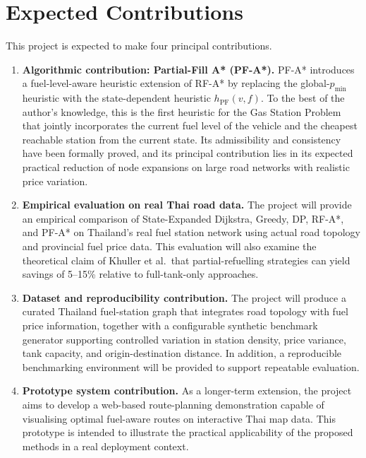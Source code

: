 \section{Expected Contributions}

This project is expected to make four principal contributions.

\begin{enumerate}
    \item \textbf{Algorithmic contribution: Partial-Fill A* (PF-A*).}
          PF-A* introduces a fuel-level-aware heuristic extension of RF-A* by replacing the global-$p_{\min}$ heuristic with the state-dependent heuristic $h_{\mathrm{PF}}(v,f)$.
          To the best of the author's knowledge, this is the first heuristic for the Gas Station Problem that jointly incorporates the current fuel level of the vehicle and the cheapest reachable station from the current state.
          Its admissibility and consistency have been formally proved, and its principal contribution lies in its expected practical reduction of node expansions on large road networks with realistic price variation.

    \item \textbf{Empirical evaluation on real Thai road data.}
          The project will provide an empirical comparison of State-Expanded Dijkstra, Greedy, DP, RF-A*, and PF-A* on Thailand's real fuel station network using actual road topology and provincial fuel price data.
          This evaluation will also examine the theoretical claim of Khuller et al.\ that partial-refuelling strategies can yield savings of 5--15\% relative to full-tank-only approaches.

    \item \textbf{Dataset and reproducibility contribution.}
          The project will produce a curated Thailand fuel-station graph that integrates road topology with fuel price information, together with a configurable synthetic benchmark generator supporting controlled variation in station density, price variance, tank capacity, and origin-destination distance.
          In addition, a reproducible benchmarking environment will be provided to support repeatable evaluation.

    \item \textbf{Prototype system contribution.}
          As a longer-term extension, the project aims to develop a web-based route-planning demonstration capable of visualising optimal fuel-aware routes on interactive Thai map data.
          This prototype is intended to illustrate the practical applicability of the proposed methods in a real deployment context.
\end{enumerate}
